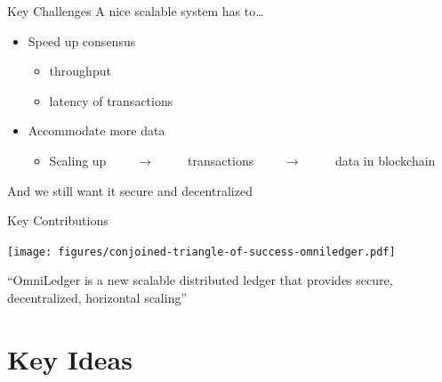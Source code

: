 	\begin{frame}{Key Challenges}
		A nice scalable system has to\ldots
		\begin{itemize}
			\item Speed up consensus
			\begin{itemize}
				\item \textuparrow throughput
				\item \textdownarrow latency of transactions
			\end{itemize}
			\item Accommodate more data
			\begin{itemize}
				\item Scaling up~~~~ $\rightarrow$ ~~~ \textuparrow~transactions~~~~ $\rightarrow$ ~~~ \textuparrow~data in blockchain
			\end{itemize}
		\end{itemize}
		
		\centering
		\vfill
		\pause
		\alert{And we still want it secure and decentralized}
		
	\end{frame}
	\note{
		\begin{itemize}
			\item 
		\end{itemize}
	}
	
	
	
	\begin{frame}{Key Contributions}
		\centering
		\begin{minipage}{.52\textwidth}
			\texttt{[image: figures/conjoined-triangle-of-success-omniledger.pdf]}
		\end{minipage}\hfill%
		\begin{minipage}{.44\textwidth}
			``OmniLedger is a new \alert{scalable} distributed ledger that provides \alert{secure}, \alert{decentralized}, \alert{horizontal} \alert{scaling}''
		\end{minipage}
	\end{frame}
	\note{
		\begin{itemize}
			\item 
		\end{itemize}
	}
	
  \section{Key Ideas}
	

